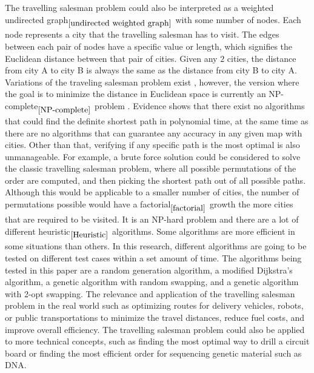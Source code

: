 \documentclass{article}
\begin{document}
\noindent
The travelling salesman problem could also be interpreted as a weighted undirected graph$_{\ref{undirected weighted graph}}$ with some number of nodes. Each node represents a city that the travelling salesman has to visit. The edges between each pair of nodes have a specific value or length, which signifies the Euclidean distance between that pair of cities. Given any $2$ cities, the distance from city A to city B is always the same as the distance from city B to city A.
\newline
Variations of the traveling salesman problem exist \cite{gutin_punnen_2007}, however, the version where the goal is to minimize the distance in Euclidean space is currently an NP-complete$_{\ref{NP-complete}}$ problem \cite{PAPADIMITRIOU1977}. 
\newline
Evidence shows that there exist no algorithms that could find the definite shortest path in polynomial time, at the same time as there are no algorithms that can guarantee any accuracy in any given map with cities. Other than that, verifying if any specific path is the most optimal is also unmanageable. \cite{PAPADIMITRIOU1977}
\newline
For example, a brute force solution could be considered to solve the classic travelling salesman problem, where all possible permutations of the order are computed, and then picking the shortest path out of all possible paths. Although this would be applicable to a smaller number of cities, the number of permutations possible would have a factorial$_{\ref{factorial}}$ growth the more cities that are required to be visited. 
\newline
It is an NP-hard problem and there are a lot of different heuristic$_{\ref{Heuristic}}$ algorithms. Some algorithms are more efficient in some situations than others. In this research, different algorithms are going to be tested on different test cases within a set amount of time. The algorithms being tested in this paper are a random generation algorithm, a modified Dijkstra's algorithm, a genetic algorithm with random swapping, and a genetic algorithm with 2-opt swapping.
\newline
The relevance and application of the travelling salesman problem in the real world such as optimizing routes for delivery vehicles, robots, or public transportations to minimize the travel distances, reduce fuel costs, and improve overall efficiency. The travelling salesman problem could also be applied to more technical concepts, such as finding the most optimal way to drill a circuit board or finding the most efficient order for sequencing genetic material such as DNA. 
\end{document}
